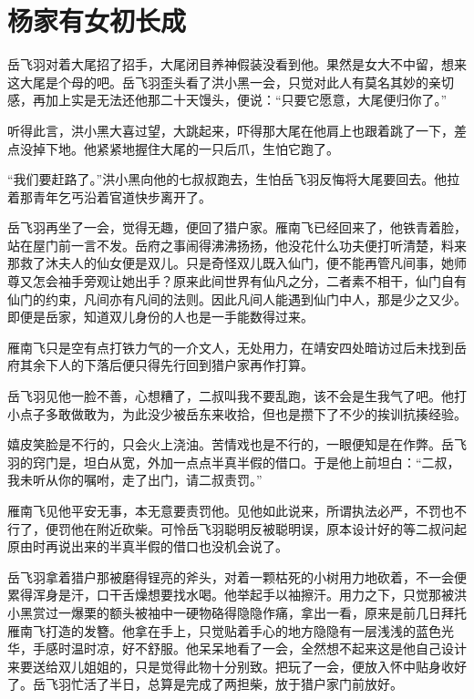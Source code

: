 \chapter{杨家有女初长成}
\label{chap:chen-jia-you-nv-chu-zhang-cheng}

岳飞羽对着大尾招了招手，大尾闭目养神假装没看到他。果然是女大不中留，想来这大尾是个母的吧。岳飞羽歪头看了洪小黑一会，只觉对此人有莫名其妙的亲切感，再加上实是无法还他那二十天馒头，便说：“只要它愿意，大尾便归你了。”

听得此言，洪小黑大喜过望，大跳起来，吓得那大尾在他肩上也跟着跳了一下，差点没掉下地。他紧紧地握住大尾的一只后爪，生怕它跑了。

“我们要赶路了。”洪小黑向他的七叔叔跑去，生怕岳飞羽反悔将大尾要回去。他拉着那青年乞丐沿着官道快步离开了。

岳飞羽再坐了一会，觉得无趣，便回了猎户家。雁南飞已经回来了，他铁青着脸，站在屋门前一言不发。岳府之事闹得沸沸扬扬，他没花什么功夫便打听清楚，料来那救了沐夫人的仙女便是双儿。只是奇怪双儿既入仙门，便不能再管凡间事，她师尊又怎会袖手旁观让她出手？原来此间世界有仙凡之分，二者素不相干，仙门自有仙门的约束，凡间亦有凡间的法则。因此凡间人能遇到仙门中人，那是少之又少。即便是岳家，知道双儿身份的人也是一手能数得过来。

雁南飞只是空有点打铁力气的一介文人，无处用力，在靖安四处暗访过后未找到岳府其余下人的下落后便只得先行回到猎户家再作打算。

岳飞羽见他一脸不善，心想糟了，二叔叫我不要乱跑，该不会是生我气了吧。他打小点子多敢做敢为，为此没少被岳东来收拾，但也是攒下了不少的挨训抗揍经验。

嬉皮笑脸是不行的，只会火上浇油。苦情戏也是不行的，一眼便知是在作弊。岳飞羽的窍门是，坦白从宽，外加一点点半真半假的借口。于是他上前坦白：“二叔，我未听从你的嘱咐，走了出门，请二叔责罚。”

雁南飞见他平安无事，本无意要责罚他。见他如此说来，所谓执法必严，不罚也不行了，便罚他在附近砍柴。可怜岳飞羽聪明反被聪明误，原本设计好的等二叔问起原由时再说出来的半真半假的借口也没机会说了。

岳飞羽拿着猎户那被磨得锃亮的斧头，对着一颗枯死的小树用力地砍着，不一会便累得浑身是汗，口干舌燥想要找水喝。他举起手以袖擦汗。用力之下，只觉那被洪小黑赏过一爆栗的额头被袖中一硬物硌得隐隐作痛，拿出一看，原来是前几日拜托雁南飞打造的发簪。他拿在手上，只觉贴着手心的地方隐隐有一层浅浅的蓝色光华，手感时温时凉，好不舒服。他呆呆地看了一会，全然想不起来这是他自己设计来要送给双儿姐姐的，只是觉得此物十分别致。把玩了一会，便放入怀中贴身收好了。岳飞羽忙活了半日，总算是完成了两担柴，放于猎户家门前放好。

